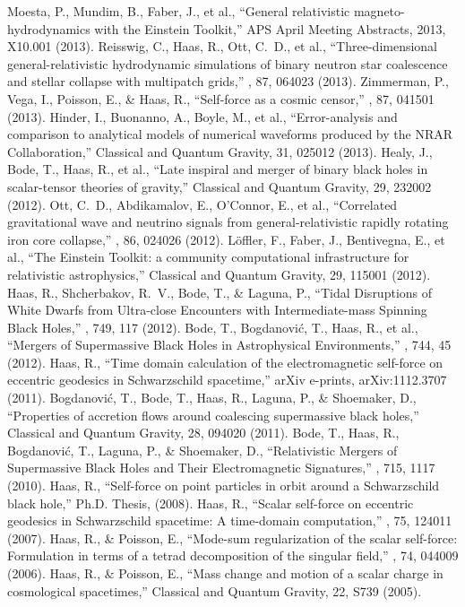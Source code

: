  Moesta, P., Mundim, B., Faber, J., et al., ``General relativistic magneto-hydrodynamics with the Einstein Toolkit,'' APS April Meeting Abstracts, 2013, X10.001 (2013).
 Reisswig, C., Haas, R., Ott, C.~D., et al., ``Three-dimensional general-relativistic hydrodynamic simulations of binary neutron star coalescence and stellar collapse with multipatch grids,'' \prd, 87, 064023 (2013).
 Zimmerman, P., Vega, I., Poisson, E., \& Haas, R., ``Self-force as a cosmic censor,'' \prd, 87, 041501 (2013).
 Hinder, I., Buonanno, A., Boyle, M., et al., ``Error-analysis and comparison to analytical models of numerical waveforms produced by the NRAR Collaboration,'' Classical and Quantum Gravity, 31, 025012 (2013).
 Healy, J., Bode, T., Haas, R., et al., ``Late inspiral and merger of binary black holes in scalar-tensor theories of gravity,'' Classical and Quantum Gravity, 29, 232002 (2012).
 Ott, C.~D., Abdikamalov, E., O'Connor, E., et al., ``Correlated gravitational wave and neutrino signals from general-relativistic rapidly rotating iron core collapse,'' \prd, 86, 024026 (2012).
 L{\"o}ffler, F., Faber, J., Bentivegna, E., et al., ``The Einstein Toolkit: a community computational infrastructure for relativistic astrophysics,'' Classical and Quantum Gravity, 29, 115001 (2012).
 Haas, R., Shcherbakov, R.~V., Bode, T., \& Laguna, P., ``Tidal Disruptions of White Dwarfs from Ultra-close Encounters with Intermediate-mass Spinning Black Holes,'' \apj, 749, 117 (2012).
 Bode, T., Bogdanovi{\'c}, T., Haas, R., et al., ``Mergers of Supermassive Black Holes in Astrophysical Environments,'' \apj, 744, 45 (2012).
 Haas, R., ``Time domain calculation of the electromagnetic self-force on eccentric geodesics in Schwarzschild spacetime,'' arXiv e-prints, arXiv:1112.3707 (2011).
 Bogdanovi{\'c}, T., Bode, T., Haas, R., Laguna, P., \& Shoemaker, D., ``Properties of accretion flows around coalescing supermassive black holes,'' Classical and Quantum Gravity, 28, 094020 (2011).
 Bode, T., Haas, R., Bogdanovi{\'c}, T., Laguna, P., \& Shoemaker, D., ``Relativistic Mergers of Supermassive Black Holes and Their Electromagnetic Signatures,'' \apj, 715, 1117 (2010).
 Haas, R., ``Self-force on point particles in orbit around a Schwarzschild black hole,'' Ph.D. Thesis, (2008).
 Haas, R., ``Scalar self-force on eccentric geodesics in Schwarzschild spacetime: A time-domain computation,'' \prd, 75, 124011 (2007).
 Haas, R., \& Poisson, E., ``Mode-sum regularization of the scalar self-force: Formulation in terms of a tetrad decomposition of the singular field,'' \prd, 74, 044009 (2006).
 Haas, R., \& Poisson, E., ``Mass change and motion of a scalar charge in cosmological spacetimes,'' Classical and Quantum Gravity, 22, S739 (2005).

